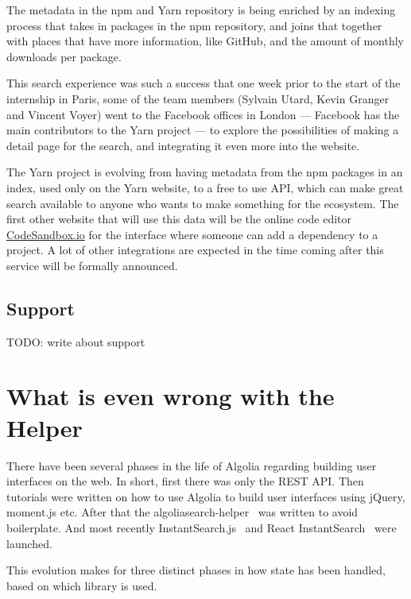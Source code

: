 The metadata in the npm and Yarn repository is being enriched by an indexing process\cite{npm-search} that takes in packages in the npm repository, and joins that together with places that have more information, like GitHub, and the amount of monthly downloads per package.

This search experience was such a success that one week prior to the start of the internship in Paris, some of the team members (Sylvain Utard, Kevin Granger and Vincent Voyer) went to the Facebook offices in London --- Facebook has the main contributors to the Yarn project --- to explore the possibilities of making a detail page for the search, and integrating it even more into the website.

The Yarn project is evolving from having metadata from the npm packages in an index, used only on the Yarn website, to a free to use API, which can make great search available to anyone who wants to make something for the ecosystem. The first other website that will use this data will be the online code editor \href{https://codesandbox.io}{CodeSandbox.io} for the interface where someone can add a dependency to a project. A lot of other integrations are expected in the time coming after this service will be formally announced.

\subsection{Support}
\label{support}

TODO: write about support

\section{What is even wrong with the Helper} %
\label{sec:what_is_even_wrong_with_the_helper}

There have been several phases in the life of Algolia regarding building user interfaces on the web. In short, first there was only the REST API\@. Then tutorials were written on how to use Algolia to build user interfaces using jQuery, moment.js etc. After that the algoliasearch-helper~\cite{algolia-js-helper} was written to avoid boilerplate. And most recently InstantSearch.js~\cite{instantsearch-js} and React InstantSearch~\cite{react-instantsearch} were launched.

This evolution makes for three distinct phases in how state has been handled, based on which library is used.

